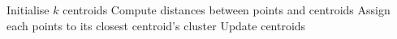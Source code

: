 \begin{algorithmic}[1]
    \State Initialise $k$ centroids
	\Repeat
		\State Compute distances between points and centroids
		\State Assign each points to its closest centroid's cluster
		\State Update centroids
\EndProcedure
\end{algorithmic}